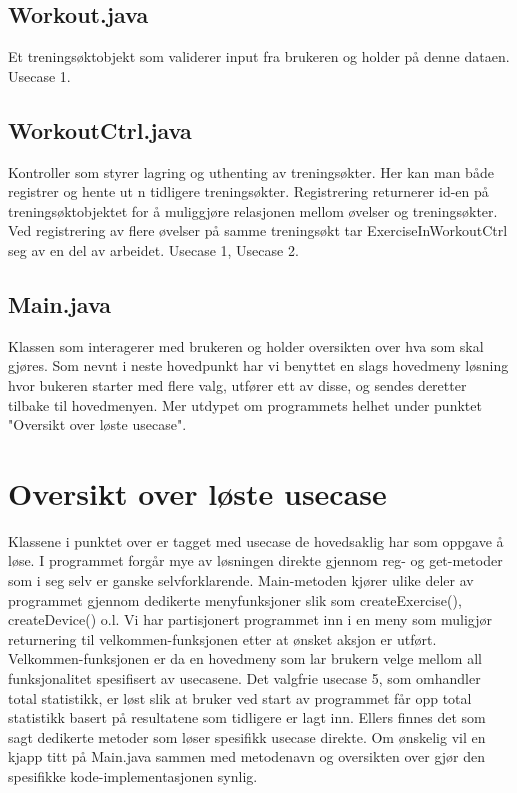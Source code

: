 \documentclass[11pt]{article}
\begin{document}
\subsection{Workout.java}
\label{sec:orgd389d9b}
Et treningsøktobjekt som validerer input fra brukeren og holder på denne dataen. Usecase 1.
\subsection{WorkoutCtrl.java}
\label{sec:orgd6a5337}
Kontroller som styrer lagring og uthenting av treningsøkter. Her kan man både registrer og hente ut n tidligere treningsøkter. Registrering returnerer id-en på treningsøktobjektet for å muliggjøre relasjonen mellom øvelser og treningsøkter. Ved registrering av flere øvelser på samme treningsøkt tar ExerciseInWorkoutCtrl seg av en del av arbeidet.
Usecase 1, Usecase 2.
\subsection{Main.java}
\label{sec:org192976b}
Klassen som interagerer med brukeren og holder oversikten over hva som skal gjøres. Som nevnt i neste hovedpunkt har vi benyttet en slags hovedmeny løsning hvor bukeren starter med flere valg, utfører ett av disse, og sendes deretter tilbake til hovedmenyen. Mer utdypet om programmets helhet under punktet "Oversikt over løste usecase".

\section{Oversikt over løste usecase}
\label{sec:orgf8e5d49}
Klassene i punktet over er tagget med usecase de hovedsaklig har som oppgave å løse. I programmet forgår mye av løsningen direkte gjennom reg- og get-metoder som i seg selv er ganske selvforklarende. Main-metoden kjører ulike deler av programmet gjennom dedikerte menyfunksjoner slik som createExercise(), createDevice() o.l. Vi har partisjonert programmet inn i en meny som muligjør returnering til velkommen-funksjonen etter at ønsket aksjon er utført. Velkommen-funksjonen er da en hovedmeny som lar brukern velge mellom all funksjonalitet spesifisert av usecasene. Det valgfrie usecase 5, som omhandler total statistikk, er løst slik at bruker ved start av programmet får opp total statistikk basert på resultatene som tidligere er lagt inn. Ellers finnes det som sagt dedikerte metoder som løser spesifikk usecase direkte. Om ønskelig vil en kjapp titt på Main.java sammen med metodenavn og oversikten over gjør den spesifikke kode-implementasjonen synlig.
\end{document}
